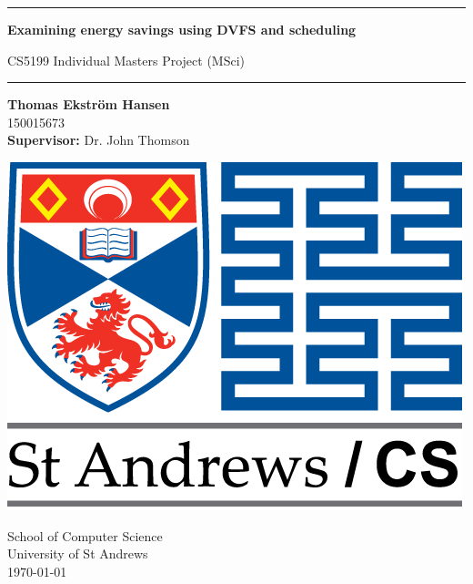 \begin{titlepage}
    \begin{center}
        \vspace*{1cm}
        
        {\rule{0.9\textwidth}{0.5mm}}
        
        \Huge
        \textbf{Examining energy savings using DVFS and scheduling}
        
        \LARGE
        CS5199 Individual Masters Project (MSci)
        
        {\noindent \hspace*{-0.65cm} \rule[0.3cm]{1.08\textwidth}{0.5mm}}
        
        \vspace{1.5cm}
        
        \sffamily
        \Large
        \textbf{Thomas Ekstr{\" o}m Hansen}\\150015673
        \\
        \textbf{Supervisor:} Dr. John Thomson
        \Large
        \rmfamily
        
        \vfill
        
        \includegraphics[width=0.4\linewidth]{titlepage/logo-uni-cs-mintext-long.png}
        
        \vspace{1.5cm}
        
        School of Computer Science
        \\
        University of St Andrews
        \\
        \vspace{3mm}
        \today
    \end{center}
\end{titlepage}